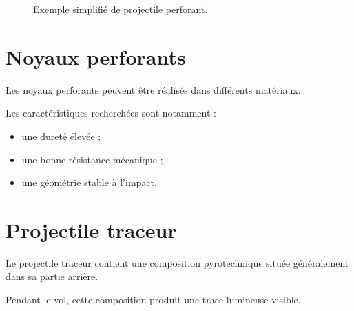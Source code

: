 \begin{figure}[htbp]
\centering


\caption{Exemple simplifié de projectile perforant.}
\label{fig:perforant}

\end{figure}

\section{Noyaux perforants}

Les noyaux perforants peuvent être réalisés dans différents matériaux.

Les caractéristiques recherchées sont notamment :

\begin{itemize}
    \item une dureté élevée ;
    \item une bonne résistance mécanique ;
    \item une géométrie stable à l'impact.
\end{itemize}

\section{Projectile traceur}

Le projectile traceur contient une composition pyrotechnique située
généralement dans sa partie arrière.

Pendant le vol, cette composition produit une trace lumineuse visible.

